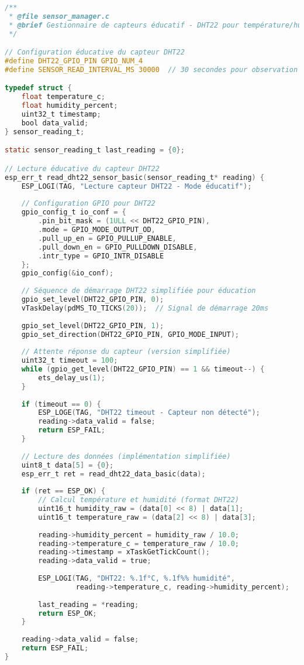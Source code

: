 \begin{lstlisting}[language=C, caption={Interface capteur éducative - sensor\_manager.c}, label=lst:sensor-manager]
/**
 * @file sensor_manager.c
 * @brief Gestionnaire de capteurs éducatif - DHT22 pour température/humidité  
 */

// Configuration éducative du capteur DHT22
#define DHT22_GPIO_PIN GPIO_NUM_4
#define SENSOR_READ_INTERVAL_MS 30000  // 30 secondes pour observation

typedef struct {
    float temperature_c;
    float humidity_percent;
    uint32_t timestamp;
    bool data_valid;
} sensor_reading_t;

static sensor_reading_t last_reading = {0};

// Lecture éducative du capteur DHT22
esp_err_t read_dht22_sensor_basic(sensor_reading_t* reading) {
    ESP_LOGI(TAG, "Lecture capteur DHT22 - Mode éducatif");
    
    // Configuration GPIO pour DHT22
    gpio_config_t io_conf = {
        .pin_bit_mask = (1ULL << DHT22_GPIO_PIN),
        .mode = GPIO_MODE_OUTPUT_OD,
        .pull_up_en = GPIO_PULLUP_ENABLE,
        .pull_down_en = GPIO_PULLDOWN_DISABLE,
        .intr_type = GPIO_INTR_DISABLE
    };
    gpio_config(&io_conf);
    
    // Séquence de démarrage DHT22 simplifiée pour éducation
    gpio_set_level(DHT22_GPIO_PIN, 0);
    vTaskDelay(pdMS_TO_TICKS(20));  // Signal de démarrage 20ms
    
    gpio_set_level(DHT22_GPIO_PIN, 1);
    gpio_set_direction(DHT22_GPIO_PIN, GPIO_MODE_INPUT);
    
    // Attente réponse du capteur (version simplifiée)
    uint32_t timeout = 100;
    while (gpio_get_level(DHT22_GPIO_PIN) == 1 && timeout--) {
        ets_delay_us(1);
    }
    
    if (timeout == 0) {
        ESP_LOGE(TAG, "DHT22 timeout - Capteur non détecté");
        reading->data_valid = false;
        return ESP_FAIL;
    }
    
    // Lecture des données (implémentation simplifiée)
    uint8_t data[5] = {0};
    esp_err_t ret = read_dht22_data_basic(data);
    
    if (ret == ESP_OK) {
        // Calcul température et humidité (format DHT22)
        uint16_t humidity_raw = (data[0] << 8) | data[1];
        uint16_t temperature_raw = (data[2] << 8) | data[3];
        
        reading->humidity_percent = humidity_raw / 10.0;
        reading->temperature_c = temperature_raw / 10.0;
        reading->timestamp = xTaskGetTickCount();
        reading->data_valid = true;
        
        ESP_LOGI(TAG, "DHT22: %.1f°C, %.1f%% humidité", 
                 reading->temperature_c, reading->humidity_percent);
        
        last_reading = *reading;
        return ESP_OK;
    }
    
    reading->data_valid = false;
    return ESP_FAIL;
}
\end{lstlisting}

